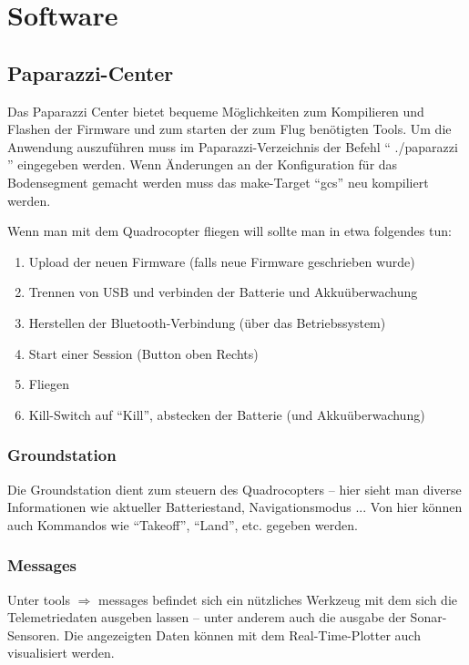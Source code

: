 \section{Software}

\subsection{Paparazzi-Center}

Das Paparazzi Center bietet bequeme Möglichkeiten zum Kompilieren und Flashen der Firmware und zum starten der zum Flug benötigten Tools.
Um die Anwendung auszuführen muss im Paparazzi-Verzeichnis der Befehl \enquote{ ./paparazzi } eingegeben werden.
Wenn Änderungen an der Konfiguration für das Bodensegment gemacht werden muss das make-Target \enquote{gcs} neu kompiliert werden.


Wenn man mit dem Quadrocopter fliegen will sollte man in etwa folgendes tun:
\begin{enumerate}
	\item Upload der neuen Firmware (falls neue Firmware geschrieben wurde)
	\item Trennen von USB und verbinden der Batterie und Akkuüberwachung
	\item Herstellen der Bluetooth-Verbindung (über das Betriebssystem)
	\item Start einer Session (Button oben Rechts)
	\item Fliegen
	\item Kill-Switch auf \enquote{Kill}, abstecken der Batterie (und Akkuüberwachung)
\end{enumerate}

\subsubsection{Groundstation}
Die Groundstation dient zum steuern des Quadrocopters – hier sieht man diverse Informationen wie aktueller Batteriestand, Navigationsmodus ...
Von hier können auch Kommandos wie \enquote{Takeoff}, \enquote{Land}, etc. gegeben werden.

\subsubsection{Messages}
Unter tools $\Rightarrow$ messages befindet sich ein nützliches Werkzeug mit dem sich die Telemetriedaten ausgeben lassen – unter anderem auch die ausgabe der Sonar-Sensoren.
Die angezeigten Daten können mit dem Real-Time-Plotter auch visualisiert werden.



